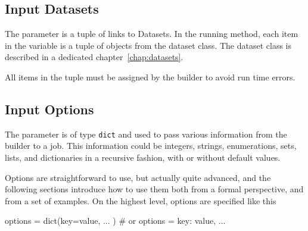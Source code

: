 \subsection*{Input Datasets}
The \datasets parameter is a tuple of links to Datasets.  In the
running method, each item in the \datasets variable is a tuple of
objects from the dataset class.  The dataset class is described in a
dedicated chapter~\ref{chap:datasets}.

All items in the \datasets tuple must be assigned by the builder to
avoid run time errors.




\subsection*{Input Options}

The \options parameter is of type \texttt{dict} and used to pass
various information from the builder to a job.  This information could
be integers, strings, enumerations, sets, lists, and dictionaries in a
recursive fashion, with or without default values.

Options are straightforward to use, but actually quite advanced, and
the following sections introduce how to use them both from a formal
perspective, and from a set of examples.  On the highest level,
options are specified like this
\begin{python}
  options = dict(key=value, ... )  # or
  options = {key: value, ...}
\end{python}


